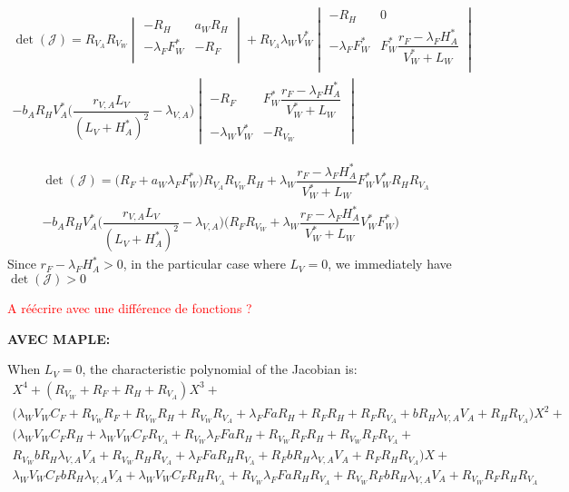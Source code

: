 \documentclass{article}
\newcommand{\lva}{\lambda_{V, A}}
\newcommand{\lfw}{\lambda_{F}}
\newcommand{\lfv}{\lambda_{W}}
\newcommand{\marc}[1]{\textcolor{red}{#1}}
\begin{document}
\begin{itemize}
\begin{multline*}
\det(\mathcal{J}) = R_{V_A}R_{V_W} \begin{vmatrix}
-R_H & a_W R_H \\
-\lfw F_W^* & -R_F \\
\end{vmatrix}  + R_{V_A} \lfv V_W^* \begin{vmatrix}
-R_H  &0 \\
-\lfw F_W^* & F_W^* \dfrac{r_F - \lfw H_A^*}{V_W^* + L_W} \\
\end{vmatrix} \\
- b_A R_H  V_A^* \Big(\dfrac{r_{V,A}L_V}{(L_V + H_A^*)^2}-\lva\Big)\begin{vmatrix}
-R_F & F_W^* \dfrac{r_F - \lfw H_A^*}{V_W^* + L_W}  \\
-\lfv V_W^* & -R_{V_W}
\end{vmatrix}
\end{multline*}

\begin{multline*}
\det(\mathcal{J}) = \Big(R_F + a_W\lfw F_W^* \Big)R_{V_A}R_{V_W}R_H  +  \lfv  \dfrac{r_F - \lfw H_A^*}{V_W^* + L_W} F_W^* V_W^* R_H R_{V_A} \\
- b_A R_H V_A^* \Big(\dfrac{r_{V,A}L_V}{(L_V + H_A^*)^2}-\lva \Big) \Big(R_F R_{V_W} + \lfv \dfrac{r_F - \lfw H_A^*}{V_W^* + L_W} V^*_W F_W^* \Big)
\end{multline*}
Since $r_F - \lfw H_A^* > 0$, in the particular case where $L_V = 0$, we immediately have $\det(\mathcal{J}) > 0$

\marc{A réécrire avec une différence de fonctions ?}

\end{itemize}

\textbf{AVEC MAPLE:}

When $L_V = 0$, the characteristic polynomial of the Jacobian is:
\begin{multline*}
X^{4}+ \left( R_{V_W}+R_{F}+R_H+R_{V_A} \right) X^{3}+ \\
 \Big( \lfv V_W C_F + R_{V_W} R_{F} + R_{V_W} R_H + R_{V_W} R_{V_A} + \lfw F a R_H + R_{F} R_H + R_{F} R_{V_A} + b R_H
\lva V_A + R_H R_{V_A} \Big) X^{2} + \\ 
\Big( \lfv V_W C_F R_H + \lfv V_W C_F R_{V_A} + R_{V_W}\lfw F a R_H + R_{V_W} R_{F} R_H + R_{V_W} R_{F} R_{V_A} + \\
R_{V_W} b R_H \lva V_A + R_{V_W} R_H R_{V_A} + \lfw F a R_H R_{V_A} + R_{F} b R_H \lva V_A + R_{F} R_H R_{V_A} \Big) X + \\
\lfv V_W C_{F} b R_H \lva V_A + \lfv V_W C_F R_H R_{V_A} + R_{V_W} \lfw F a R_H R_{V_A} + R_{V_W} R_{F} b R_H \lva V_A + R_{V_W} R_{F} R_H R_{V_A}
\end{multline*}
\end{document}
